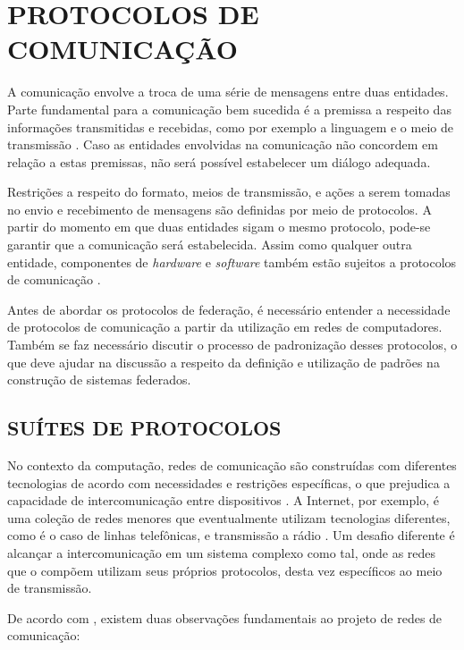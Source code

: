 \chapter{PROTOCOLOS DE COMUNICAÇÃO}
\label{chapter:2}

A comunicação envolve a troca de uma série de mensagens entre duas entidades. Parte
fundamental para a comunicação bem sucedida é a premissa a respeito das informações
transmitidas e recebidas, como por exemplo a linguagem e o meio de transmissão
\cite{comer2000}. Caso as entidades envolvidas na comunicação não concordem em
relação a estas premissas, não será possível estabelecer um diálogo adequada.

Restrições a respeito do formato, meios de transmissão, e ações a serem tomadas no
envio e recebimento de mensagens são definidas por meio de protocolos. A partir do
momento em que duas entidades sigam o mesmo protocolo, pode-se garantir que a
comunicação será estabelecida. Assim como qualquer outra entidade, componentes de
\textit{hardware} e \textit{software} também estão sujeitos a protocolos de
comunicação \cite{kurose2012}.

Antes de abordar os protocolos de federação, é necessário entender a necessidade de
protocolos de comunicação a partir da utilização em redes de computadores. Também se
faz necessário discutir o processo de padronização desses protocolos, o que deve
ajudar na discussão a respeito da definição e utilização de padrões na construção de
sistemas federados. 



\section{SUÍTES DE PROTOCOLOS}

No contexto da computação, redes de comunicação são construídas com diferentes
tecnologias de acordo com necessidades e restrições específicas, o que prejudica a
capacidade de intercomunicação entre dispositivos \cite{comer2000}. A Internet, por
exemplo, é uma coleção de redes menores que eventualmente utilizam tecnologias
diferentes, como é o caso de linhas telefônicas, e transmissão a rádio
\cite{tanenbaum2010}. Um desafio diferente é alcançar a intercomunicação em um
sistema complexo como tal, onde as redes que o compõem utilizam seus próprios
protocolos, desta vez específicos ao meio de transmissão.

De acordo com \cite{comer2000}, existem duas observações fundamentais ao projeto de
redes de comunicação:

